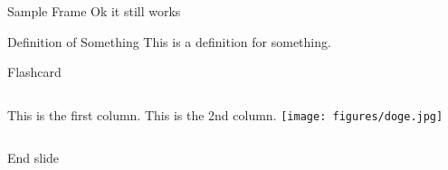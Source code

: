 


\begin{frame}
    \titlepage
\end{frame}

\begin{frame}[t]
{Sample Frame} \vspace{4pt}
    Ok it still works
   \begin{block}
{Definition of Something}
        \vspace{0.5em}
       This is a definition for something.
       \vspace{0.5em}
   \end{block}
\end{frame}

\begin{frame}[t]
{Flashcard} \vspace{4pt}
   \begin{columns}[onlytextwidth]
       This is the first column.
       This is the 2nd column.
       \vspace{10pt}
       \texttt{[image: figures/doge.jpg]}
   \end{columns}
\end{frame}

\begin{frame}[standout]
    \vspace{25pt}
    End slide
\end{frame}


